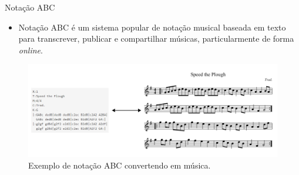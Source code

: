 \documentclass[xcolor=table]{beamer}
\begin{document}
    \begin{frame}{Notação ABC}
        \vspace{0.1cm}
        \begin{itemize}
            \justifying
            \item Notação ABC é um sistema popular de notação musical baseada em texto para transcrever, publicar e compartilhar músicas, particularmente de forma \textit{online}. 
        \end{itemize}

        \begin{figure}
            \vspace{-0.5cm}
            \centering
            \includegraphics[scale=0.25]{figuras/abc_notation_example.pdf}
	        \caption{Exemplo de notação ABC convertendo em música.}
        \end{figure}
    \end{frame}
\end{document}
